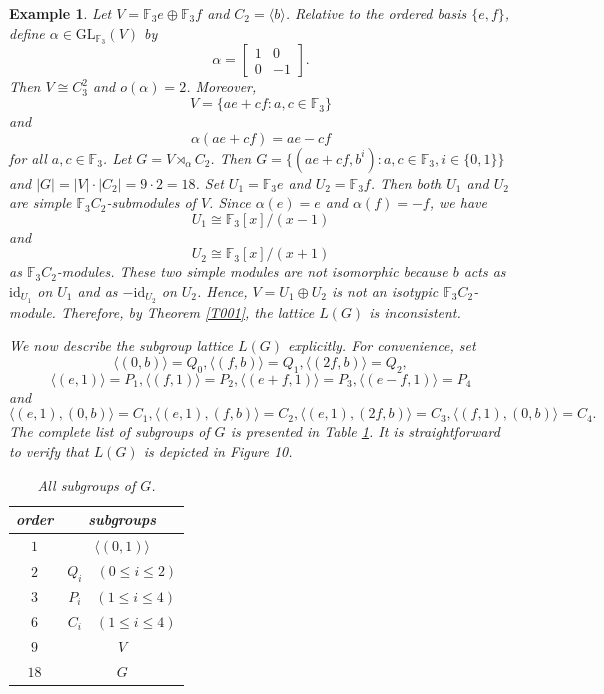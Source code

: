 \documentclass[12pt]{article}
\newtheorem{example}{\bf Example}[section]
\begin{document}
\begin{example}\label{example001}
\emph{Let $V=\mathbb{F}_{3}e\oplus \mathbb{F}_{3}f$ and $C_2=\langle b\rangle$. Relative to the ordered basis $\{e,f\}$, define $\alpha\in \mbox{GL}_{\mathbb{F}_{3}}(V)$ by
$$\alpha=\begin{bmatrix}
	    1 & 0 \\
	    0 & -1
	\end{bmatrix}.$$
Then $V\cong C^{2}_{3}$ and $o(\alpha)=2$. 
Moreover, $$V=\{ae+cf: a, c\in \mathbb{F}_{3}\}$$ and 
$$\alpha(ae+cf)=ae-cf$$ for all $a,c\in \mathbb{F}_{3}$. 
Let $G=V\rtimes_{\alpha} C_2$. Then $G=\{(ae+cf,b^{i}): a,c\in \mathbb{F}_{3}, i\in \{0,1\}\}$ and $|G|=|V|\cdot |C_2|=9\cdot 2=18$.
Set $U_{1}=\mathbb{F}_{3}e$ and $U_{2}=\mathbb{F}_{3}f$. Then both $U_1$ and $U_2$ 
are simple $\mathbb{F}_{3}C_2$-submodules of $V$. Since $\alpha(e)=e$ and $\alpha(f)=-f$, we have 
$$U_1\cong \mathbb{F}_{3}[x]/(x-1)$$
and 
$$U_2\cong \mathbb{F}_{3}[x]/(x+1)$$
as $\mathbb{F}_3C_2$-modules.
These two simple modules are not isomorphic because $b$ acts as $\mbox{id}_{U_1}$ on $U_1$
and as $-\mbox{id}_{U_2}$ on $U_2$. Hence, $V=U_1\oplus U_2$ is not an isotypic $\mathbb{F}_{3}C_2$-module.
Therefore, by Theorem \ref{T001}, the lattice $L(G)$ is inconsistent.}

\emph{We now describe the subgroup lattice $L(G)$ explicitly. For convenience, set $$\langle (0,b)\rangle=Q_0, \langle (f,b)\rangle=Q_1, \langle (2f,b)\rangle=Q_2,$$ 
$$\langle (e,1)\rangle=P_1, \langle (f,1)\rangle=P_2, \langle (e+f,1)\rangle=P_3, \langle (e-f, 1)\rangle=P_4$$ 
and 
$$\langle (e,1),(0,b)\rangle=C_1, \langle (e,1),(f,b)\rangle=C_2, \langle (e,1), (2f,b)\rangle=C_3, \langle (f,1),(0,b)\rangle=C_4.$$ The complete list of subgroups of $G$ is presented in Table \ref{Tab:01}. It is straightforward to verify that $L(G)$ is depicted in Figure 10.}
\begin{table}[!h]
\centering
\caption{All subgroups of $G$.}
\label{Tab:01}
\begin{tabular}{c|c}
order & subgroups \\
 \hline
 $1$ & $\langle (0,1)\rangle$  \\
 $2$ & $Q_i \quad (0\leq i\leq 2)$  \\
 $3$ & $P_i \quad (1\leq i\leq 4)$ \\
 $6$ & $C_i \quad (1\leq i\leq 4)$\\
 $9$ & $V$ \\
 $18$ & $G$\\
 \end{tabular}
\end{table}


\end{example}
\end{document}
